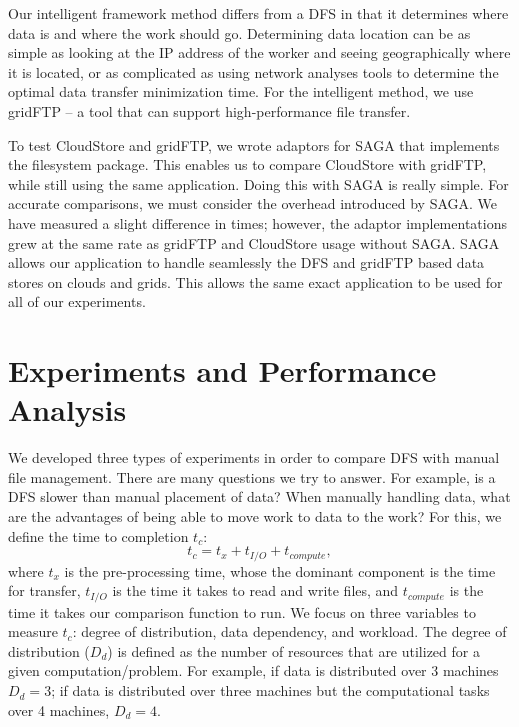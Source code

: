 \documentclass{rspublic}
\begin{document}
Our intelligent framework method differs from a DFS in that it
determines where data is and where the work should go. Determining
data location can be as simple as looking at the IP address of the
worker and seeing geographically where it is located, or as
complicated as using network analyses tools to determine the optimal
data transfer minimization time. For the intelligent method, we use
gridFTP -- a tool that can support high-performance file transfer.

To test CloudStore and gridFTP, we wrote adaptors for SAGA that
implements the filesystem package. This enables us to compare CloudStore
with gridFTP, while still using the same application. Doing this with
SAGA is really simple. For accurate comparisons, we must consider the
overhead introduced by SAGA. We have measured a slight difference in
times; however, the adaptor implementations grew at the same rate as
gridFTP and CloudStore usage without SAGA.  SAGA allows our application
to handle seamlessly the DFS and gridFTP based data stores on clouds and
grids.  This allows the same exact application to be used for all of our
experiments.


\vspace{-0.3cm}

\section{Experiments and Performance Analysis} 
We developed three types of experiments in order to compare DFS with
manual file management. There are many questions we try to answer. For
example, is a DFS slower than manual placement of data? When manually
handling data, what are the advantages of being able to move work to
data to the work? For this, we define the time to completion $t_c$:
 \begin{equation}
t_c = t_x + t_{I/O} + t_{compute},
\end{equation}
where $t_x$ is the pre-processing time, whose the dominant component is
the time for transfer, $t_{I/O}$ is the time it takes to read and write
files, and $t_{compute}$ is the time it takes our comparison function to
run. We focus on three variables to measure $t_c$: degree of
distribution, data dependency, and workload. The degree of distribution
($D_d$) is defined as the number of resources that are utilized for a
given computation/problem. For example, if data is distributed over 3
machines $D_d=3$; if data is distributed over three machines but the
computational tasks over 4 machines, $D_d=4$.
\end{document}
